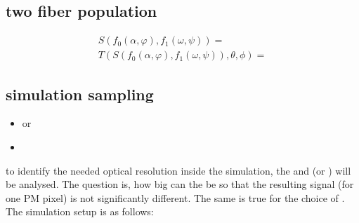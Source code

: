\subsection{two fiber population}
\begin{align*}
    S(f_0(\alpha, \varphi), f_1(\omega, \psi)) = \\
    T(S(f_0(\alpha, \varphi), f_1(\omega, \psi)), \theta, \phi) = 
\end{align*}

\subsection{simulation sampling}
% 
\begin{itemize}
    \item \micro or \macro
    \item \voxelsize
\end{itemize}

to identify the needed optical resolution inside the simulation, the \voxelsize and \model(\micro or \macro) will be analysed.
The question is, how big can the \voxelsize be so that the resulting signal (for one \ac{PM} pixel) is not significantly different.
The same is true for the choice of \model.
The simulation setup is as follows:


